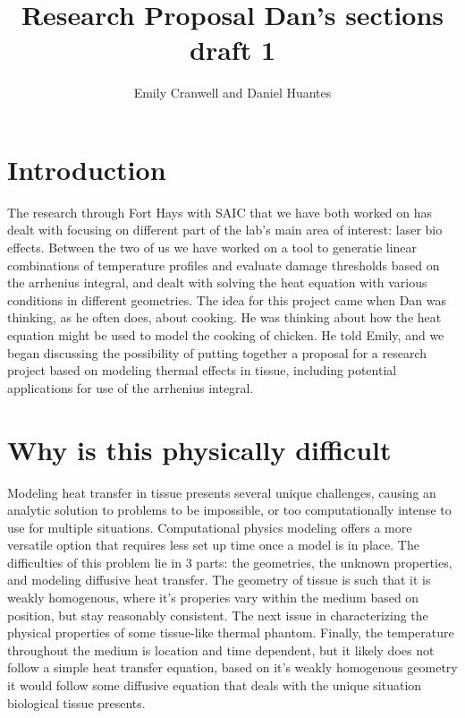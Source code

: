 \documentclass[12pt]{article}
\begin{document}
\title{Research Proposal
\large Dan's sections draft 1}
\author{Emily Cranwell and Daniel Huantes}
\maketitle
\section{Introduction}
The research through Fort Hays with SAIC that we have both worked on has dealt with focusing on different part of the lab's main area of interest: laser bio effects. Between the two of us  we have worked on a tool to generatie linear combinations of temperature profiles and evaluate damage thresholds based on the arrhenius integral, and dealt with solving the heat equation with various conditions in different geometries. The idea for this project came when Dan was thinking, as he often does, about cooking. He was thinking about how the heat equation might be used to model the cooking of chicken. He told Emily, and we began discussing the possibility of putting together a proposal for a research project based on modeling thermal effects in tissue, including potential applications for use of the arrhenius integral.
\section{Why is this physically difficult}
Modeling heat transfer in tissue presents several unique challenges, causing an analytic solution to problems to be impossible, or too computationally intense to use for multiple situations. Computational physics modeling offers a more versatile option that requires less set up time once a model is in place. The difficulties of this problem lie in 3 parts: the geometries, the unknown properties, and modeling diffusive heat transfer.
The geometry of tissue is such that it is weakly homogenous, where it's properies vary within the medium based on position, but stay reasonably consistent. The next issue in characterizing the physical properties of some tissue-like thermal phantom. Finally, the temperature throughout the medium is location and time dependent, but it likely does not follow a simple heat transfer equation, based on it's weakly homogenous geometry it would follow some diffusive equation that deals with the unique situation biological tissue presents.
\end{document}
